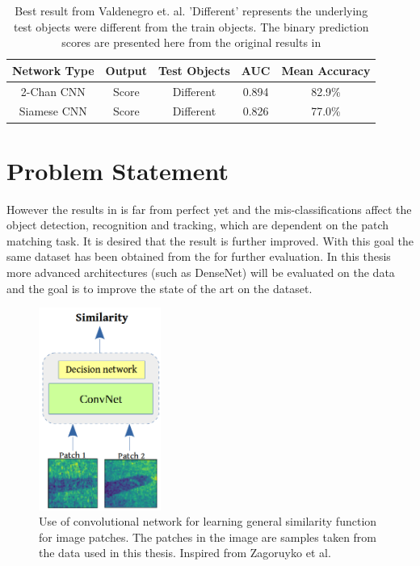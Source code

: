 \begin{table}
\centering
 \begin{tabular}{|c c c c c|} 
 \hline\hline
 Network Type & Output & Test Objects & AUC & Mean Accuracy \\ [0.5ex] 
 \hline
 2-Chan CNN & Score & Different & 0.894 & 82.9\% \\ 
 \hline
 Siamese CNN & Score & Different & 0.826 & 77.0\% \\
 \hline \hline
\end{tabular}
\caption{Best result from Valdenegro et. al. 'Different' represents the underlying test objects were different from the train objects. The binary prediction scores are presented here from the original 
results in \cite{stateoftheart}}
\label{best_results_stateoftheart}
\end{table}

\newpage

\section{Problem Statement}
\label{sec:problem_statement}
However the results in \cite{stateoftheart} is far from perfect yet and the mis-classifications affect the object detection, recognition and tracking, 
which are dependent on the patch matching task. It is desired that the result is further improved. With this goal the same dataset has been obtained from the \cite{stateoftheart} for further evaluation.
In this thesis more advanced architectures (such as DenseNet) \cite{densenet} will be evaluated on the data and the goal is to improve the state of the art on the dataset. 


\begin{figure}
\hspace{1cm}
\includegraphics[width=4cm]{images/densenet/similarity_fn}
\caption{Use of convolutional network for learning general similarity function for image patches. The patches in the image are samples taken from the data used in this thesis. 
Inspired from Zagoruyko et al.\cite{zagoruyko2015learning}}
\label{similarity_function_wraped}
\end{figure} 

